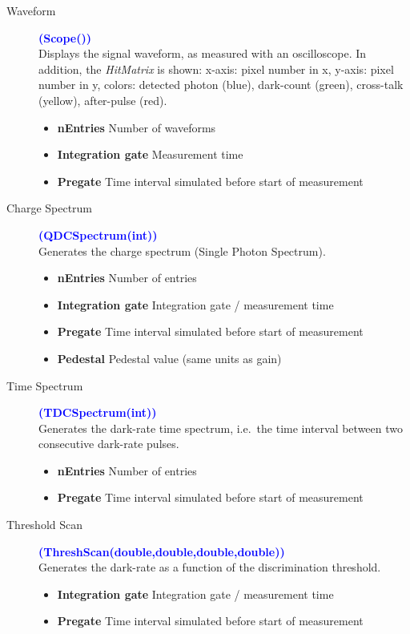 \begin{description}
	\item[Waveform] \textcolor{blue}{\textbf{(Scope())}}\\
		Displays the signal waveform, as measured with an oscilloscope. In addition, the \textit{HitMatrix} is shown: x-axis: pixel number in x, y-axis: pixel number in y, colors: detected photon (blue), dark-count (green), cross-talk (yellow), after-pulse (red).
	\begin{itemize}
		\item \textbf{nEntries} Number of waveforms
		\item \textbf{Integration gate} Measurement time
		\item \textbf{Pregate} Time interval simulated before start of measurement
	\end{itemize}
	\item[Charge Spectrum] \textcolor{blue}{\textbf{(QDCSpectrum(int))}}\\
		Generates the charge spectrum (Single Photon Spectrum).
	\begin{itemize}
		\item \textbf{nEntries} Number of entries
		\item \textbf{Integration gate} Integration gate / measurement time
		\item \textbf{Pregate} Time interval simulated before start of measurement
		\item \textbf{Pedestal} Pedestal value (same units as gain)
	\end{itemize}
	\item[Time Spectrum] \textcolor{blue}{\textbf{(TDCSpectrum(int))}}\\
		Generates the dark-rate time spectrum, i.e.\ the time interval between two consecutive dark-rate pulses.
	\begin{itemize}
		\item \textbf{nEntries} Number of entries
		\item \textbf{Pregate} Time interval simulated before start of measurement
	\end{itemize}
	\item[Threshold Scan] \textcolor{blue}{\textbf{(ThreshScan(double,double,double,double))}}\\
		Generates the dark-rate as a function of the discrimination threshold.
	\begin{itemize}
		\item \textbf{Integration gate} Integration gate / measurement time
		\item \textbf{Pregate} Time interval simulated before start of measurement

\end{itemize}
\end{description}
